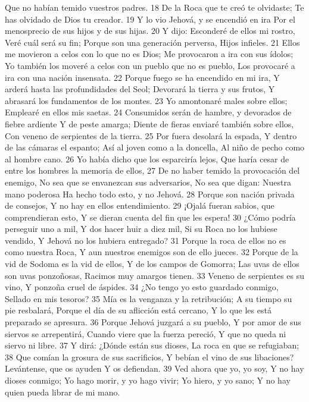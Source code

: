 Que no habían temido vuestros padres. 
18 De la Roca que te creó te olvidaste;
Te has olvidado de Dios tu creador.
19 Y lo vio Jehová, y se encendió en ira
Por el menosprecio de sus hijos y de sus hijas. 
20 Y dijo: Esconderé de ellos mi rostro,
Veré cuál será su fin;
Porque son una generación perversa,
Hijos infieles.
21 Ellos me movieron a celos con lo que no es Dios;
Me provocaron a ira con sus ídolos;
Yo también los moveré a celos con un pueblo que no es pueblo,
Los provocaré a ira con una nación insensata. 
22 Porque fuego se ha encendido en mi ira,
Y arderá hasta las profundidades del Seol;
Devorará la tierra y sus frutos,
Y abrasará los fundamentos de los montes.
23 Yo amontonaré males sobre ellos;
Emplearé en ellos mis saetas.
24 Consumidos serán de hambre, y devorados de fiebre ardiente
Y de peste amarga;
Diente de fieras enviaré también sobre ellos,
Con veneno de serpientes de la tierra.
25 Por fuera desolará la espada,
Y dentro de las cámaras el espanto;
Así al joven como a la doncella,
Al niño de pecho como al hombre cano.
26 Yo había dicho que los esparciría lejos,
Que haría cesar de entre los hombres la memoria de ellos,
27 De no haber temido la provocación del enemigo,
No sea que se envanezcan sus adversarios,
No sea que digan: Nuestra mano poderosa
Ha hecho todo esto, y no Jehová.
28 Porque son nación privada de consejos,
Y no hay en ellos entendimiento.
29 ¡Ojalá fueran sabios, que comprendieran esto,
Y se dieran cuenta del fin que les espera!
30 ¿Cómo podría perseguir uno a mil,
Y dos hacer huir a diez mil,
Si su Roca no los hubiese vendido,
Y Jehová no los hubiera entregado? 
31 Porque la roca de ellos no es como nuestra Roca,
Y aun nuestros enemigos son de ello jueces.
32 Porque de la vid de Sodoma es la vid de ellos,
Y de los campos de Gomorra;
Las uvas de ellos son uvas ponzoñosas,
Racimos muy amargos tienen.
33 Veneno de serpientes es su vino,
Y ponzoña cruel de áspides.
34 ¿No tengo yo esto guardado conmigo,
Sellado en mis tesoros?
35 Mía es la venganza y la retribución;
A su tiempo su pie resbalará,
Porque el día de su aflicción está cercano,
Y lo que les está preparado se apresura.
36 Porque Jehová juzgará a su pueblo,
Y por amor de sus siervos se arrepentirá, 
Cuando viere que la fuerza pereció,
Y que no queda ni siervo ni libre.
37 Y dirá: ¿Dónde están sus dioses,
La roca en que se refugiaban;
38 Que comían la grosura de sus sacrificios,
Y bebían el vino de sus libaciones?
Levántense, que os ayuden
Y os defiendan.
39 Ved ahora que yo, yo soy,
Y no hay dioses conmigo;
Yo hago morir, y yo hago vivir;
Yo hiero, y yo sano;
Y no hay quien pueda librar de mi mano.
